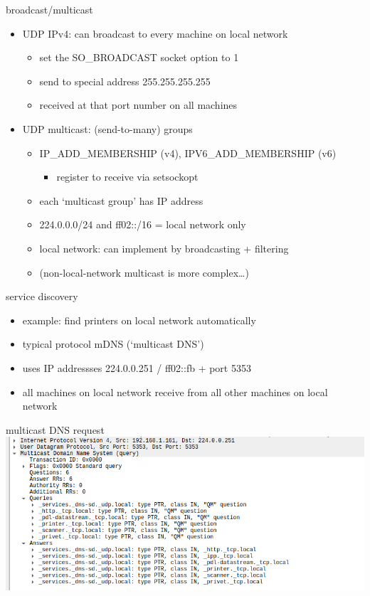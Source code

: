 \begin{frame}{broadcast/multicast}
\begin{itemize}
\item UDP IPv4: can broadcast to every machine on local network
    \begin{itemize}
    \item set the SO\_BROADCAST socket option to 1
    \item send to special address 255.255.255.255 
    \item received at that port number on all machines
    \end{itemize}
\item UDP multicast: (send-to-many) groups
    \begin{itemize}
    \item IP\_ADD\_MEMBERSHIP (v4), IPV6\_ADD\_MEMBERSHIP (v6)
        \begin{itemize}
        \item register to receive via setsockopt
        \end{itemize}
    \item each `multicast group' has IP address
    \item 224.0.0.0/24 and ff02::/16 = local network only
    \item local network: can implement by broadcasting + filtering
    \item (non-local-network multicast is more complex\ldots)
    \end{itemize}
\end{itemize}
\end{frame}

\begin{frame}{service discovery}
\begin{itemize}
\item example: find printers on local network automatically
\vspace{.5cm}
\item typical protocol mDNS (`multicast DNS')
\item uses IP addressses 224.0.0.251 / ff02::fb + port 5353
\item all machines on local network receive from all other machines on local network
\end{itemize}
\end{frame}

\begin{frame}[fragile]{multicast DNS request}
\includegraphics[height=0.85\textheight]{../sockets/mdns-request}
\end{frame}

